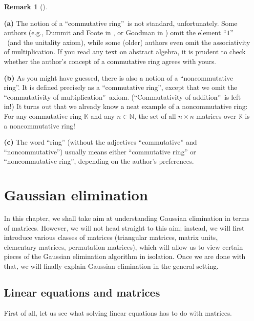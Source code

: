 \documentclass[numbers=enddot,12pt,final,onecolumn,notitlepage]{scrartcl}%
\theoremstyle{definition}
\newtheorem{remk}[theo]{Remark}
\newenvironment{remark}[1][]
{\begin{remk}[#1]\begin{leftbar}}
{\end{leftbar}\end{remk}}
\begin{document}
\begin{remark}
\textbf{(a)} The notion of a \textquotedblleft commutative
ring\textquotedblright\ is not standard, unfortunately. Some authors (e.g.,
Dummit and Foote in \cite[Part II]{DumFoo04}, or Goodman in \cite[Chapters 1
and 6]{Goodma15}) omit the element \textquotedblleft$1$\textquotedblright%
\ (and the unitality axiom), while some (older) authors even omit the
associativity of multiplication. If you read any text on abstract algebra, it
is prudent to check whether the author's concept of a commutative ring agrees
with yours.

\textbf{(b)} As you might have guessed, there is also a notion of a
\textquotedblleft noncommutative ring\textquotedblright. It is defined
precisely as a \textquotedblleft commutative ring\textquotedblright, except
that we omit the \textquotedblleft commutativity of
multiplication\textquotedblright\ axiom. (\textquotedblleft Commutativity of
addition\textquotedblright\ is left in!) It turns out that we already know a
neat example of a noncommutative ring: For any commutative ring $\mathbb{K}$
and any $n\in\mathbb{N}$, the set of all $n\times n$-matrices over
$\mathbb{K}$ is a noncommutative ring!

\textbf{(c)} The word ``ring'' (without the adjectives ``commutative'' and
``noncommutative'') usually means either ``commutative ring'' or
``noncommutative ring'', depending on the author's preferences.
\end{remark}

\section{\label{sect.gauss}Gaussian elimination}

In this chapter, we shall take aim at understanding Gaussian elimination in
terms of matrices. However, we will not head straight to this aim; instead, we
will first introduce various classes of matrices (triangular matrices, matrix
units, elementary matrices, permutation matrices), which will allow us to view
certain pieces of the Gaussian elimination algorithm in isolation. Once we are
done with that, we will finally explain Gaussian elimination in the general setting.

\subsection{Linear equations and matrices}

First of all, let us see what solving linear equations has to do with matrices.
\end{document}
